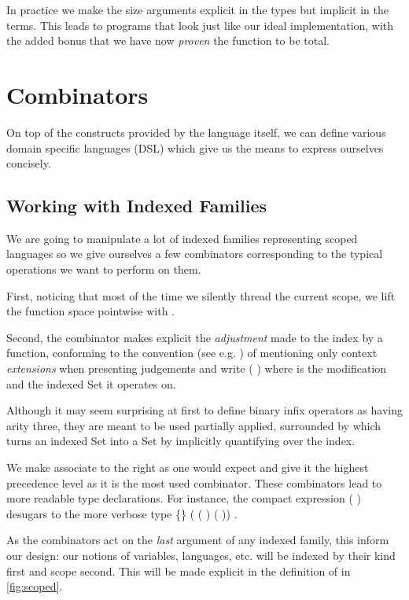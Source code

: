 In practice we make the size arguments explicit in the types but implicit in the
terms. This leads to programs that look just like our ideal implementation, with
the added bonus that we have now \emph{proven} the function to be total.


\section{Combinators}

On top of the constructs provided by the language itself, we can define various
domain specific languages (DSL) which give us the means to express ourselves
concisely.

\subsection{Working with Indexed Families}
\label{indexed-combinators}

We are going to manipulate a lot of indexed families representing scoped languages
so we give ourselves a few combinators corresponding to the typical operations we
want to perform on them.

First, noticing that most of the time we silently thread the current scope, we lift
the function space pointwise with .


Second, the  combinator makes explicit the \emph{adjustment} made to the
index by a function, conforming to the convention (see e.g. \cite{martin1982constructive})
of mentioning only context \emph{extensions} when presenting judgements and write
({  }) where  is the modification and  the indexed
Set it operates on.


Although it may seem surprising at first to define binary infix operators as having
arity three, they are meant to be used partially applied, surrounded by 
which turns an indexed Set into a Set by implicitly quantifying over the index.


We make  associate to the right as one would expect and give it the
highest precedence level as it is the most used combinator. These combinators
lead to more readable type declarations.  For instance, the compact expression
\AF{∀[}   (  )   \AF{]}
desugars to the more verbose type
 \{\}  ( ( )   ( ))   .



As the combinators act on the \emph{last} argument of any indexed family, this inform our
design: our notions of variables, languages, etc. will be indexed by their kind first and
scope second. This will be made explicit in the definition of  in
\cref{fig:scoped}.
